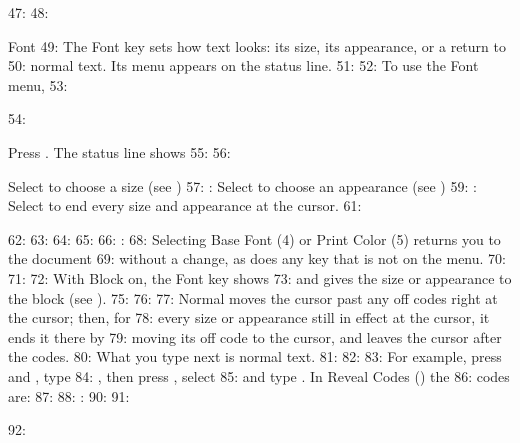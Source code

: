 47: 
48: \begin{Feature}{Font}
49: The Font key sets how text looks: its size, its appearance, or a return to
50: normal text.  Its menu appears on the status line.
51: 
52: To use the Font menu,
53: \begin{WPSteps}
54: \item Press .  The status line shows
55: 
56: \item Select  to choose a size (see )
57: : Select  to choose an appearance (see )
59: : Select  to end every size and appearance at the cursor.
61: \end{WPSteps}
62: 
63: 
64: 
65: 
66: : 
68: Selecting Base Font (4) or Print Color (5) returns you to the document
69: without a change, as does any key that is not on the menu.
70: 
71: 
72: With Block on, the Font key shows 
73: and gives the size or appearance to the block (see ).
75: 
76: 
77: Normal moves the cursor past any off codes right at the cursor; then, for
78: every size or appearance still in effect at the cursor, it ends it there by
79: moving its off code to the cursor, and leaves the cursor after the codes.
80: What you type next is normal text.
81: 
82: 
83: For example, press  and , type
84: , then press , select 
85: and type .  In Reveal Codes () the
86: codes are:
87: 
88: : 
90: 
91: \end{Feature}
92: 
